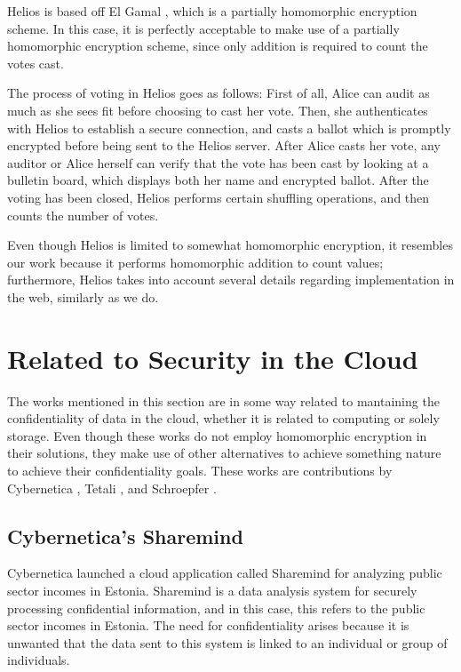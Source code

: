 Helios is based off El Gamal \cite{ElGamal:1985:PKC:19478.19480}, which is a partially homomorphic encryption scheme. In this case, it is perfectly acceptable to make use of a partially homomorphic encryption scheme, since only addition is required to count the votes cast. 

The process of voting in Helios goes as follows: 
First of all, Alice can audit as much as she sees fit before choosing to cast her vote.  Then, she authenticates with Helios to establish a secure connection, and casts a ballot which is promptly encrypted before being sent to the Helios server. After Alice casts her vote, any auditor or Alice herself can verify that the vote has been cast by looking at a bulletin board, which displays both her name and encrypted ballot. After the voting has been closed, Helios performs certain shuffling operations, and then counts the number of votes.

Even though Helios is limited to somewhat homomorphic encryption, it resembles our work because it performs homomorphic addition to count values; furthermore, Helios takes into account several details regarding implementation in the web, similarly as we do.

\section{{Related to Security in the Cloud}}
The works mentioned in this section are in some way related to mantaining the confidentiality of data in the cloud, whether it is related to computing or solely storage. Even though these works do not employ homomorphic encryption in their solutions, they make use of other alternatives to achieve something nature to achieve their confidentiality goals. These works are contributions by Cybernetica \cite{cybernetica}, Tetali \cite{Tetali:2013:MSA:2544173.2509554}, and Schroepfer \cite{Schroepfer:2011:DSC:2046707.2093509}.

\subsection{Cybernetica's Sharemind}
Cybernetica \cite{cybernetica} launched a cloud application called Sharemind for analyzing public sector incomes in Estonia. Sharemind is a data analysis system for securely processing confidential information, and in this case, this refers to the public sector incomes in Estonia. The need for confidentiality arises because it is unwanted that the data sent to this system is linked to an individual or group of individuals. 

